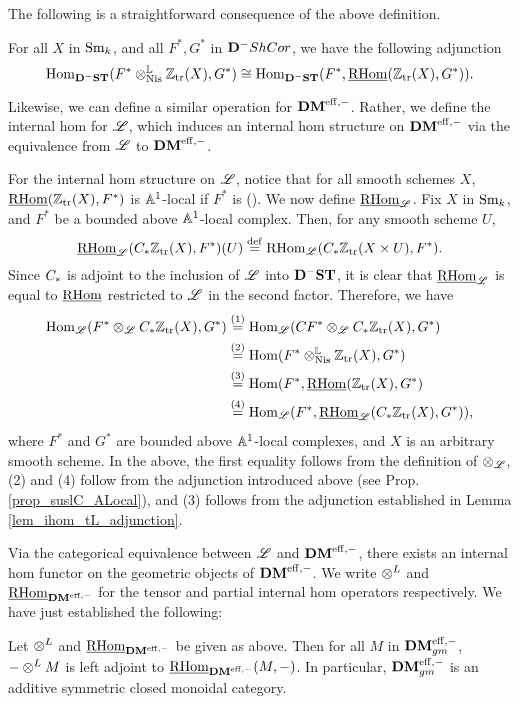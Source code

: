 The following is a straightforward consequence of the above 
definition.

\begin{lem}\label{lem_ihom_tL_adjunction}
For all $X$ in $\Sm$, and all $F^*, G^*$ in $\DCat^-\ShCor$, we 
have the following adjunction
\[
\hom_{\DShCor}(F^*\tLNis \Ztr(X), G^*) \cong
\hom_{\DShCor}(F^*, \sheaf{\rhom}(\Ztr(X), G^*)).
\]
\end{lem}

Likewise, we can define a similar operation for $\DMeff$. Rather,
we define the internal hom for $\ALocal$, which induces an internal
hom structure on $\DMeff$ via the equivalence from $\ALocal$ to
$\DMeff$.

For the internal hom structure on $\ALocal$, notice that for all
smooth schemes $X$, $\sheaf{\rhom}(\Ztr(X), F^*)$ is $\A^1$-local if 
$F^*$ is (\cite[14.12]{MVW}). We now define $\ihomAL$. Fix $X$ in
$\Sm$, and $F^*$ be a bounded above $\A^1$-local complex. Then, for
any smooth scheme $U$,
\[
\ihomAL(\suslC \Ztr(X), F^*)(U) \defeq \rhom_{\ALocal}(\suslC 
   \Ztr(X \times U), F^*).
\]
Since $\suslC$ is adjoint to the inclusion of $\ALocal$ into 
$\DShCor$, it is clear that $\ihomAL$ is equal to $\sheaf{\rhom}$
restricted to $\ALocal$ in the second factor. Therefore, we have
\begin{align*}
\hom_{\ALocal}(F^* \tAL \suslC \Ztr(X), G^*) &\stackrel{(1)}{=}
\hom_{\ALocal}(\suslC[] F^* \tAL \suslC \Ztr(X), G^*) \\ 
&\stackrel{(2)}{=} \hom(F^* \tLNis \Ztr(X), G^*) \\
&\stackrel{(3)}{=} \hom(F^*, \sheaf{\rhom}(\Ztr(X), G^*) \\
&\stackrel{(4)}{=} \hom_{\ALocal}(F^*, \ihomAL(\suslC \Ztr(X), G^*)),
\end{align*}
where $F^*$ and $G^*$ are bounded above $\A^1$-local complexes,
and $X$ is an arbitrary smooth scheme. In the above, the first 
equality follows from the definition of $\tAL$, (2) and (4) 
follow from the adjunction introduced above (see Prop.  
\ref{prop_suslC_ALocal}), and (3) follows from the adjunction
established in Lemma \ref{lem_ihom_tL_adjunction}. 

Via the categorical equivalence between $\ALocal$ and $\DMeff$,
there exists an internal hom functor on the geometric objects
of $\DMeff$. We write $\tDM$ and $\ihomDMf$ for the tensor and
partial internal hom operators respectively. We have just
established the following:

\begin{prop}\label{prop_DMgm_monoidal}
Let $\tDM$ and $\ihomDMf$ be given as above. Then for all
$M$ in $\DMeffgm$, $- \tDM M$ is left adjoint to $\ihomDMf(M, -)$.
In particular, $\DMeffgm$ is an additive symmetric closed monoidal 
category.
\end{prop}


